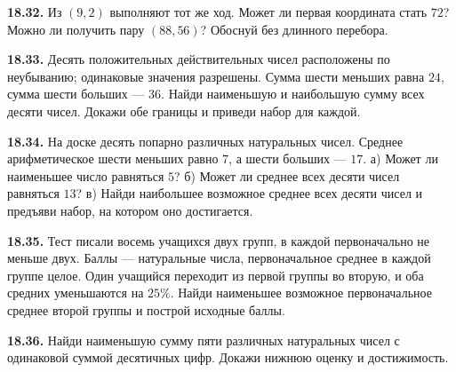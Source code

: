 \noindent\begin{minipage}[t]{\linewidth}\textbf{18.32.}\starmark{} Из \((9,2)\) выполняют тот же ход. Может ли первая координата стать \(72\)? Можно ли получить пару \((88,56)\)? Обоснуй без длинного перебора.\par\end{minipage}\par
\noindent\begin{minipage}[t]{\linewidth}\textbf{18.33.}\starmark{} Десять положительных действительных чисел расположены по неубыванию; одинаковые значения разрешены. Сумма шести меньших равна \(24\), сумма шести больших --- \(36\). Найди наименьшую и наибольшую сумму всех десяти чисел. Докажи обе границы и приведи набор для каждой.\par\end{minipage}\par
\noindent\begin{minipage}[t]{\linewidth}\textbf{18.34.}\starmark{} На доске десять попарно различных натуральных чисел. Среднее арифметическое шести меньших равно \(7\), а шести больших --- \(17\). а) Может ли наименьшее число равняться \(5\)? б) Может ли среднее всех десяти чисел равняться \(13\)? в) Найди наибольшее возможное среднее всех десяти чисел и предъяви набор, на котором оно достигается.\par\end{minipage}\par
\noindent\begin{minipage}[t]{\linewidth}\textbf{18.35.}\starmark{} Тест писали восемь учащихся двух групп, в каждой первоначально не меньше двух. Баллы --- натуральные числа, первоначальное среднее в каждой группе целое. Один учащийся переходит из первой группы во вторую, и оба средних уменьшаются на \(25\%\). Найди наименьшее возможное первоначальное среднее второй группы и построй исходные баллы.\par\end{minipage}\par
\noindent\begin{minipage}[t]{\linewidth}\textbf{18.36.}\starmark{} Найди наименьшую сумму пяти различных натуральных чисел с одинаковой суммой десятичных цифр. Докажи нижнюю оценку и достижимость.\par\end{minipage}\par
\endgroup
